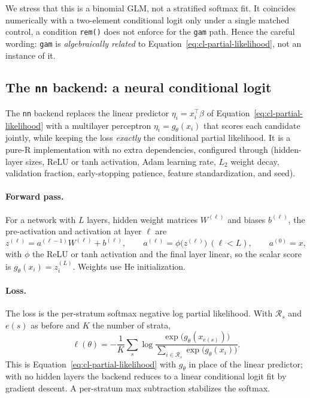 We stress that this is a binomial GLM, not a stratified softmax fit. It
coincides numerically with a two-element conditional logit only under a single
matched control, a condition \texttt{rem()} does not enforce for the
\texttt{gam} path. Hence the careful wording: \texttt{gam} is
\emph{algebraically related} to Equation~\eqref{eq:cl-partial-likelihood}, not
an instance of it.

\subsection{The \texttt{nn} backend: a neural conditional logit}
\label{sec:framework-nn}

The \texttt{nn} backend replaces the linear predictor $\eta_i = x_i^{\top}\beta$
of Equation~\eqref{eq:cl-partial-likelihood} with a multilayer perceptron
$\eta_i = g_\theta(x_i)$ that scores each candidate jointly, while keeping the
loss \emph{exactly} the conditional partial likelihood. It is a pure-R
implementation with no extra dependencies, configured through
 (hidden-layer sizes, ReLU or tanh activation, Adam learning
rate, $L_2$ weight decay, validation fraction, early-stopping patience, feature
standardization, and seed).

\paragraph{Forward pass.}
For a network with $L$ layers, hidden weight matrices $W^{(\ell)}$ and biases
$b^{(\ell)}$, the pre-activation and activation at layer $\ell$ are
\begin{equation}
  \label{eq:nn-forward}
  z^{(\ell)} = a^{(\ell-1)} W^{(\ell)} + b^{(\ell)},
  \qquad
  a^{(\ell)} = \phi\!\big(z^{(\ell)}\big) \ (\ell < L),
  \qquad
  a^{(0)} = x,
\end{equation}
with $\phi$ the ReLU or tanh activation and the final layer linear, so the
scalar score is $g_\theta(x_i) = z^{(L)}_i$. Weights use He initialization.

\paragraph{Loss.}
The loss is the per-stratum softmax negative log partial likelihood. With
$\mathcal{R}_s$ and $e(s)$ as before and $K$ the number of strata,
\begin{equation}
  \label{eq:nn-loss}
  \ell(\theta)
  = -\frac{1}{K}\sum_{s} \log
    \frac{\exp\!\big(g_\theta(x_{e(s)})\big)}
         {\sum_{i \in \mathcal{R}_s} \exp\!\big(g_\theta(x_i)\big)}.
\end{equation}
This is Equation~\eqref{eq:cl-partial-likelihood} with $g_\theta$ in place of
the linear predictor; with no hidden layers the backend reduces to a linear
conditional logit fit by gradient descent. A per-stratum max subtraction
stabilizes the softmax.

